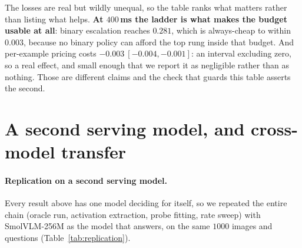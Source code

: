 \documentclass[10pt,twocolumn]{article}
\theoremstyle{plain}
\begin{document}
\begin{table}[t]
\centering\small
\setlength{\tabcolsep}{4pt}
\caption{Each variant swept over six operator preferences and read at a fixed
budget, $1200$ DocVQA pages, $30$ resamples. Deltas are paired against the
reference frontier.}
\label{tab:ablation}
\end{table}

The losses are real but wildly unequal, so the table ranks what matters rather
than listing what helps. \textbf{At $400$\,ms the
ladder is what makes the budget usable at all}: binary escalation reaches
$0.281$, which is always-cheap to within $0.003$, because no binary policy can
afford the top rung inside that budget. And per-example pricing costs $-0.003\
[-0.004, -0.001]$: an interval excluding zero, so a real effect, and small
enough that we report it as negligible rather than as nothing. Those are
different claims and the check that guards this table asserts the second.


\section{A second serving model, and cross-model transfer}
\paragraph{Replication on a second serving model.} Every result above has one
model deciding for itself, so we repeated the entire chain (oracle run, activation extraction, probe fitting, rate sweep) with SmolVLM-256M as the
model that answers, on the same $1000$ images and questions
(Table~\ref{tab:replication}).
\end{document}
